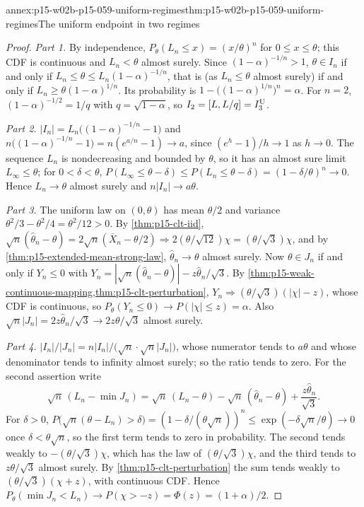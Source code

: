\begin{annexitem}{annex:p15-w02b-p15-059-uniform-regimes}{thm:p15-w02b-p15-059-uniform-regimes}{The uniform endpoint in two regimes}
\begin{proof}
\emph{Part 1.} By independence, \(P_\theta(L_n\leq x)=(x/\theta)^n\) for
\(0\leq x\leq\theta\); this CDF is continuous and \(L_n<\theta\) almost
surely. Since \((1-\alpha)^{-1/n}>1\), \(\theta\in I_n\) if and only if
\(L_n\leq\theta\leq L_n(1-\alpha)^{-1/n}\), that is (as \(L_n\leq\theta\)
almost surely) if and only if \(L_n\geq\theta(1-\alpha)^{1/n}\). Its
probability is \(1-\bigl((1-\alpha)^{1/n}\bigr)^n=\alpha\). For \(n=2\),
\((1-\alpha)^{-1/2}=1/q\) with \(q=\sqrt{1-\alpha}\), so
\(I_2=[L,L/q]=I_3^{\rm U}\).

\emph{Part 2.} \(|I_n|=L_n\bigl((1-\alpha)^{-1/n}-1\bigr)\) and
\(n\bigl((1-\alpha)^{-1/n}-1\bigr)=n(e^{a/n}-1)\to a\), since
\((e^{h}-1)/h\to1\) as \(h\to0\). The sequence \(L_n\) is nondecreasing and
bounded by \(\theta\), so it has an almost sure limit
\(L_\infty\leq\theta\); for \(0<\delta<\theta\),
\(P(L_\infty\leq\theta-\delta)\leq P(L_n\leq\theta-\delta)
=(1-\delta/\theta)^n\to0\). Hence \(L_n\to\theta\) almost surely and
\(n|I_n|\to a\theta\).

\emph{Part 3.} The uniform law on \((0,\theta)\) has mean \(\theta/2\) and
variance \(\theta^2/3-\theta^2/4=\theta^2/12>0\). By
\cref{thm:p15-clt-iid},
\(\sqrt n(\widehat\theta_n-\theta)=2\sqrt n(\bar X_n-\theta/2)\Rightarrow
2(\theta/\sqrt{12})\chi=(\theta/\sqrt3)\chi\), and by
\cref{thm:p15-extended-mean-strong-law}, \(\widehat\theta_n\to\theta\)
almost surely. Now \(\theta\in J_n\) if and only if \(Y_n\leq0\) with
\(Y_n=|\sqrt n(\widehat\theta_n-\theta)|-z\widehat\theta_n/\sqrt3\). By
\cref{thm:p15-weak-continuous-mapping,thm:p15-clt-perturbation},
\(Y_n\Rightarrow(\theta/\sqrt3)(|\chi|-z)\), whose CDF is continuous, so
\(P_\theta(Y_n\leq0)\to P(|\chi|\leq z)=\alpha\). Also
\(\sqrt n|J_n|=2z\widehat\theta_n/\sqrt3\to2z\theta/\sqrt3\) almost surely.

\emph{Part 4.} \(|I_n|/|J_n|=n|I_n|/\bigl(\sqrt n\cdot\sqrt n|J_n|\bigr)\),
whose numerator tends to \(a\theta\) and whose denominator tends to
infinity almost surely; so the ratio tends to zero. For the second
assertion write
\[
 \sqrt n\,(L_n-\min J_n)=\sqrt n\,(L_n-\theta)
   -\sqrt n\,(\widehat\theta_n-\theta)+\frac{z\widehat\theta_n}{\sqrt3}.
\]
For \(\delta>0\),
\(P\bigl(\sqrt n(\theta-L_n)>\delta\bigr)=(1-\delta/(\theta\sqrt n))^n
\leq\exp(-\delta\sqrt n/\theta)\to0\) once \(\delta<\theta\sqrt n\), so
the first term tends to zero in probability. The second tends weakly to
\(-(\theta/\sqrt3)\chi\), which has the law of \((\theta/\sqrt3)\chi\), and
the third tends to \(z\theta/\sqrt3\) almost surely. By
\cref{thm:p15-clt-perturbation} the sum tends weakly to
\((\theta/\sqrt3)(\chi+z)\), with continuous CDF. Hence
\(P_\theta(\min J_n<L_n)\to P(\chi>-z)=\Phi(z)=(1+\alpha)/2\).
\end{proof}
\end{annexitem}

